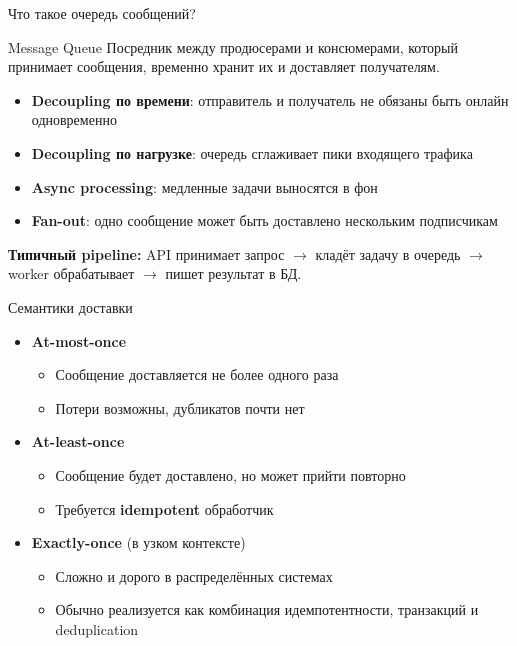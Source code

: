 \documentclass{beamer}
\begin{document}
\begin{frame}{Что такое очередь сообщений?}
\begin{block}{Message Queue}
  Посредник между продюсерами и консюмерами, который принимает сообщения, временно хранит их и доставляет получателям.
\end{block}
\begin{itemize}
  \item \textbf{Decoupling по времени}: отправитель и получатель не обязаны быть онлайн одновременно
  \item \textbf{Decoupling по нагрузке}: очередь сглаживает пики входящего трафика
  \item \textbf{Async processing}: медленные задачи выносятся в фон
  \item \textbf{Fan-out}: одно сообщение может быть доставлено нескольким подписчикам
\end{itemize}
\vspace{0.3cm}
\textbf{Типичный pipeline:} API принимает запрос $\to$ кладёт задачу в очередь $\to$ worker обрабатывает $\to$ пишет результат в БД.
\end{frame}

\begin{frame}{Семантики доставки}
\begin{itemize}
  \item \textbf{At-most-once}
  \begin{itemize}
    \item Сообщение доставляется не более одного раза
    \item Потери возможны, дубликатов почти нет
  \end{itemize}
  \item \textbf{At-least-once}
  \begin{itemize}
    \item Сообщение будет доставлено, но может прийти повторно
    \item Требуется \textbf{idempotent} обработчик
  \end{itemize}
  \item \textbf{Exactly-once} (в узком контексте)
  \begin{itemize}
    \item Сложно и дорого в распределённых системах
    \item Обычно реализуется как комбинация идемпотентности, транзакций и deduplication
  \end{itemize}
\end{itemize}
\end{frame}
\end{document}
